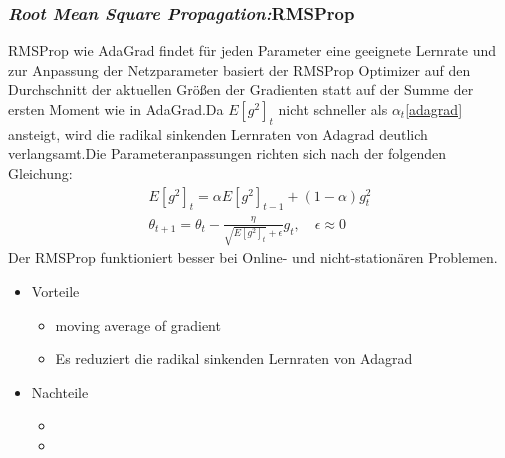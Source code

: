 \documentclass[12pt,a4paper]{scrartcl}
\numberwithin{equation}{section}
\begin{document}
\subsubsection{\textit{Root Mean Square Propagation:}RMSProp}
RMSProp wie AdaGrad findet für jeden Parameter eine geeignete Lernrate und zur Anpassung der Netzparameter basiert der RMSProp Optimizer auf den Durchschnitt der aktuellen Größen der Gradienten statt auf der Summe der ersten Moment wie in AdaGrad.Da $ E[g^2]_t $ nicht schneller als $ \alpha_{t} $\eqref{adagrad} ansteigt, wird die radikal sinkenden Lernraten von Adagrad deutlich verlangsamt.Die Parameteranpassungen richten sich nach der folgenden Gleichung:
\begin{equation}\label{RMSProp}
	\begin{split}
	E[g^2]_t =\alpha E[g^2]_{t-1} +(1-\alpha)g^2_{t}\\
	\theta_{t+1} = \theta_{t} -\frac{\eta}{\sqrt{E[g^2]_t}+\epsilon} g_t, \quad  \epsilon \approx 0
	\end{split}
\end{equation}
Der RMSProp funktioniert besser bei Online- und nicht-stationären Problemen.
\begin{itemize}
	\item Vorteile
	\begin{itemize}
		\item moving average of gradient
		\item Es reduziert die radikal sinkenden Lernraten von Adagrad
	\end{itemize}
	\item Nachteile
	\begin{itemize}
		\item 
		\item 
	\end{itemize}
\end{itemize}
\end{document}
